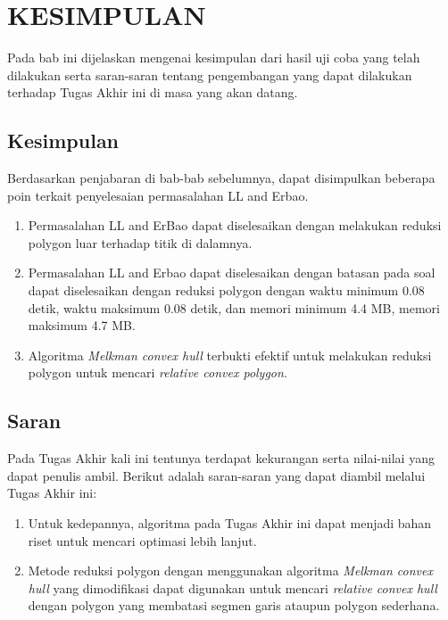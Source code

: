 \chapter{KESIMPULAN}
Pada bab ini dijelaskan mengenai kesimpulan dari hasil uji coba yang telah dilakukan serta saran-saran tentang pengembangan yang dapat dilakukan terhadap Tugas Akhir ini di masa yang akan datang.
\section{ Kesimpulan}
Berdasarkan penjabaran di bab-bab sebelumnya, dapat disimpulkan beberapa poin terkait penyelesaian permasalahan LL and Erbao.
\begin{enumerate}
\item Permasalahan LL and ErBao dapat diselesaikan dengan melakukan reduksi polygon luar terhadap titik di dalamnya.
\item Permasalahan LL and Erbao dapat diselesaikan dengan batasan pada soal dapat diselesaikan dengan reduksi polygon dengan waktu minimum 0.08 detik, waktu maksimum 0.08 detik, dan memori minimum 4.4 MB, memori maksimum 4.7 MB.
\item Algoritma \textit{Melkman convex hull} terbukti efektif untuk melakukan reduksi polygon untuk mencari \textit{relative convex polygon}.
\end{enumerate}
\section{ Saran}
Pada Tugas Akhir kali ini tentunya terdapat kekurangan serta nilai-nilai yang dapat penulis ambil. Berikut adalah saran-saran yang dapat diambil melalui Tugas Akhir ini:
\begin{enumerate}
 \item Untuk kedepannya, algoritma pada Tugas Akhir ini dapat menjadi bahan riset untuk mencari optimasi lebih lanjut.
 \item Metode reduksi polygon dengan menggunakan algoritma \textit{Melkman convex hull} yang dimodifikasi dapat digunakan untuk mencari \textit{relative convex hull} dengan polygon yang membatasi segmen garis ataupun polygon sederhana.
\end{enumerate}